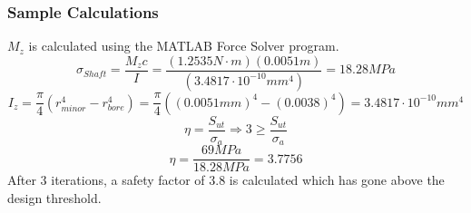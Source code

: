\documentclass[../main.tex]{subfiles}
\begin{document}
\subsubsection*{Sample Calculations}
$M_z$ is calculated using the MATLAB Force Solver program.
$$\sigma _{Shaft}  = \dfrac{M_{z}c}{I} = \dfrac{(1.2535N\cdot{}m)(0.0051m)}{(3.4817\cdot{}10^{-10}mm^4)}=18.28MPa$$
$$I _{z}  = \dfrac{\pi}{4} (r_{minor}^4 - r_{bore}^4) = \dfrac{\pi}{4} ((0.0051mm)^4 - (0.0038)^4) = 3.4817\cdot{}10^{-10}mm^4$$
$$\eta = \dfrac{S_{ut}}{\sigma _a} \Rightarrow 3 \geq \dfrac{S_{ut}}{\sigma _a}$$
$$\eta = \dfrac{69MPa}{18.28MPa}=3.7756$$
After 3 iterations, a safety factor of 3.8 is calculated which has gone above the design threshold.
\end{document}
